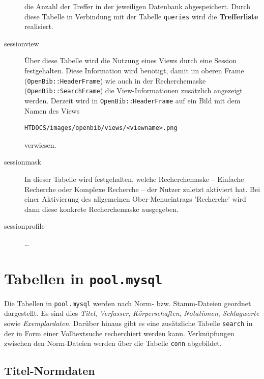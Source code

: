 \documentclass[11pt, twoside, a4paper, BCOR8mm, DIV12, bibtotoc,idxtotoc]{scrbook}
\begin{document}
\begin{description}
  die Anzahl der Treffer in der jeweiligen Datenbank
  ab\-ge\-spei\-chert. Durch diese Tabelle in Verbindung mit der Tabelle
  \texttt{queries} wird die \textbf{Trefferliste} realisiert.
\item[sessionview] Über diese Tabelle wird die Nutzung eines Views
  durch eine Session festgehalten. Diese Information wird benötigt,
  damit im oberen Frame (\texttt{OpenBib::HeaderFrame}) wie auch in der
  Recherchemaske (\texttt{OpenBib::SearchFrame}) die View-Informationen
  zusätzlich angezeigt werden. Derzeit wird in \texttt{OpenBib::HeaderFrame}
  auf ein Bild mit dem Namen des Views
\begin{verbatim}
HTDOCS/images/openbib/views/<viewname>.png
\end{verbatim}

  verwiesen.
\item[sessionmask] In dieser Tabelle wird festgehalten, welche
  Recherchemaske -- Einfache Recherche oder Komplexe Recherche -- der
  Nutzer zuletzt aktiviert hat. Bei einer Aktivierung des allgemeinen
  Ober-Menueintrags 'Recherche' wird dann diese konkrete
  Recherchemaske aus\-ge\-ge\-ben.
\item[sessionprofile] \dots
\end{description}

\chapter{Tabellen in \texttt{pool.mysql}}

Die Tabellen in \texttt{pool.mysql} werden nach Norm- bzw.
Stamm-Dateien geordnet dargestellt. Es sind dies \emph{Titel},
\emph{Verfasser}, \emph{Körperschaften}, \emph{Notationen},
\emph{Schlagworte} sowie \emph{Exemplardaten}. Darüber hinaus gibt es eine zusätzliche
Tabelle \texttt{search} in der in Form einer Volltextsuche
recherchiert werden kann. Verknüpfungen zwischen den Norm-Dateien
werden über die Tabelle \texttt{conn} abgebildet.

\section{Titel-Normdaten}
\end{document}
